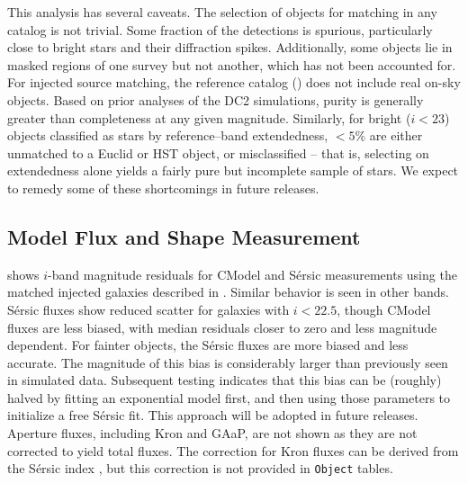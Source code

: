 This analysis has several caveats.
The selection of objects for matching in any catalog is not trivial.
Some fraction of the detections is spurious, particularly close to bright stars and their diffraction spikes.
Additionally, some objects lie in masked regions of one survey but not another, which has not been accounted for.
For injected source matching, the reference catalog () does not include real on-sky objects.
Based on prior analyses of the \gls{DC2} simulations, purity is generally greater than completeness at any given magnitude.
Similarly, for bright ($i < 23$) objects classified as stars by reference--band extendedness, $<5\%$ are either unmatched to a Euclid or HST object, or misclassified -- that is, selecting on extendedness alone yields a fairly pure but incomplete sample of stars.
We expect to remedy some of these shortcomings in future releases.

\subsection{Model Flux and Shape Measurement}
\label{ssec:fluxes}

 shows $i$-band magnitude residuals for CModel and S\'ersic measurements using the matched injected galaxies described in .
Similar behavior is seen in other bands.
S\'ersic fluxes show reduced scatter for galaxies with $i < 22.5$, though CModel fluxes are less biased, with median residuals closer to zero and less magnitude dependent.
For fainter objects, the S\'ersic fluxes are more biased and less accurate.
The magnitude of this bias is considerably larger than previously seen in simulated data.
Subsequent testing indicates that this bias can be (roughly) halved by fitting an exponential model first, and then using those parameters to initialize a free S\'ersic fit.
This approach will be adopted in future releases.
Aperture fluxes,  including Kron and \gls{GAaP},  are not shown as they are not corrected to yield total fluxes.
The correction for Kron fluxes can be derived from the S\'ersic index \citep[][]{2005PASA...22..118G}, but this correction is not provided in \texttt{Object} tables.

